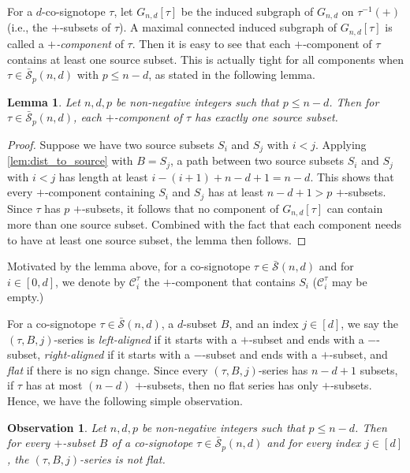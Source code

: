 \documentclass[a4paper,11pt]{amsart}
\newtheorem{lemma}[theorem]{Lemma}
\newtheorem{observation}[theorem]{Observation}
\newcommand{\C}{\mathcal{C}}
\newcommand{\calS}{\mathcal{S}}
\newcommand{\defi}[1]{\textcolor{defblue}{\emph{#1}}}
\begin{document}
For a $d$-co-signotope $\tau$, let $G_{n,d}[\tau]$ be the induced subgraph of $G_{n,d}$ on $\tau^{-1}(+)$ (i.e., the $+$-subsets of $\tau$).
A maximal connected induced subgraph of $G_{n,d}[\tau]$ is called a \defi{$+$-component} of $\tau$.
Then it is easy to see that each $+$-component of $\tau$ contains at least one source subset.
This is actually tight for all components when $\tau \in \bar{\calS}_p(n,d)$ with $p  \leq n-d$, as stated in the following lemma.

\begin{lemma}
\label{lem:exact_one_source}
    Let $n,d,p$ be non-negative integers such that $p \leq n-d$.
    Then for $\tau \in \bar{\calS}_p(n,d)$, each $+$-component of $\tau$ has exactly one source subset.
\end{lemma}
\begin{proof}
    Suppose we have two source subsets $S_i$ and $S_j$ with $i<j$. 
    Applying \cref{lem:dist_to_source} with $B = S_j$, a path between two source subsets $S_i$ and $S_j$ with $i<j$ has length at least $i - (i+1) + n - d +1 = n-d$. This shows that every $+$-component containing $S_i$ and $S_j$ has at least $n-d+1 > p$ $+$-subsets. 
    Since $\tau$ has $p$ $+$-subsets, it follows that no component of $G_{n,d}[\tau]$ can contain more than one source subset.
    Combined with the fact that each component needs to have at least one source subset, the lemma then follows.
\end{proof}

Motivated by the lemma above, for a co-signotope $\tau \in \bar{\calS}(n,d)$ and for $i\in[0,d]$, we denote by $\C^{\tau}_i$ the $+$-component that contains $S_i$
($\C^{\tau}_i$ may be empty.)

For a co-signotope $\tau \in \bar{\calS}(n,d)$, a $d$-subset $B$, and an index $j \in [d]$, we say the $(\tau,B,j)$-series is \defi{left-aligned} if it starts with a $+$-subset and ends with a $-$-subset, \defi{right-aligned} if it starts with a $-$-subset and ends with a $+$-subset, and \defi{flat} if there is no sign change.
Since every $(\tau,B,j)$-series has $n-d+1$ subsets, if $\tau$ has at most $(n-d)$ $+$-subsets, then no flat series has only $+$-subsets.
Hence, we have the following simple observation.

\begin{observation}
\label{ob:no_flat}
    Let $n,d,p$ be non-negative integers such that $p \leq n-d$.
    Then for every $+$-subset $B$ of a co-signotope $\tau \in \bar{\calS}_p(n,d)$ and for every index $j \in [d]$, the $(\tau,B,j)$-series is not flat.
\end{observation}
\end{document}
